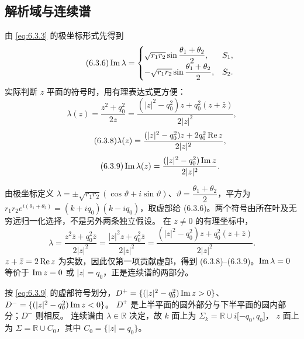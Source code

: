 \documentclass[lang=cn,scheme=chinese,mode=simple,device=normal,color=blue,
math=cm,thmcnt=section,12pt]{elegantbook}
\newcommand{\eqq}[2]{\tag{#1}\label{eq:#1}#2}
\begin{document}
\subsection{解析域与连续谱}
由 \eqref{eq:6.3.3} 的极坐标形式先得到
\begin{equation}
    \eqq{6.3.6}{\Imm\lambda=
        \begin{cases}\sqrt{r_1r_2}\sin\dfrac{\theta_1+\theta_2}{2},  & S_1, \\
             -\sqrt{r_1r_2}\sin\dfrac{\theta_1+\theta_2}{2}, & S_2.
        \end{cases}}
\end{equation}
实际判断 $z$ 平面的符号时，用有理表达式更方便：
\begin{equation}\eqq{6.3.7}{\lambda(z)=\dfrac{z^2+q_0^2}{2z}
        =\dfrac{(|z|^2-q_0^2)z+q_0^2(z+\bar z)}{2|z|^2},}\end{equation}
\begin{equation}\eqq{6.3.8}{\lambda(z)=\dfrac{(|z|^2-q_0^2)z+2q_0^2\Ree z}{2|z|^2},}\end{equation}
\begin{equation}\eqq{6.3.9}{\Imm\lambda(z)=\dfrac{(|z|^2-q_0^2)\Imm z}{2|z|^2}.}\end{equation}

\begin{callout}[计算：(6.3.3)、(6.3.6)–(6.3.9) 的分支及代数中间式]
    由极坐标定义 $\lambda=\pm\sqrt{r_1r_2}(\cos\vartheta+i\sin\vartheta)$、$\vartheta=\dfrac{\theta_1+\theta_2}{2}$，平方为 $r_1r_2e^{i(\theta_1+\theta_2)}=(k+iq_0)(k-iq_0)$，取虚部给 (6.3.6)。两个符号由所在叶及无穷远归一化选择，不是另外两条独立假设。
    在 $z\ne0$ 的有理坐标中，
    \[
        \lambda=\dfrac{z^2\bar z+q_0^2\bar z}{2|z|^2}
        =\dfrac{|z|^2z+q_0^2\bar z}{2|z|^2}
        =\dfrac{(|z|^2-q_0^2)z+q_0^2(z+\bar z)}{2|z|^2}.
    \]
    $z+\bar z=2\operatorname{Re} z$ 为实数，因此仅第一项贡献虚部，得到 (6.3.8)–(6.3.9)。$\operatorname{Im}\lambda=0$ 等价于 $\operatorname{Im} z=0$ 或 $|z|=q_0$，正是连续谱的两部分。
\end{callout}

按 \eqref{eq:6.3.9} 的虚部符号划分，$D^+=\{(|z|^2-q_0^2)\operatorname{Im} z>0\}$、$D^-=\{(|z|^2-q_0^2)\operatorname{Im} z<0\}$。
$D^+$ 是上半平面的圆外部分与下半平面的圆内部分；$D^-$ 则相反。
连续谱由 $\lambda\in\mathbb R$ 决定，故 $k$ 面上为 $\Sigma_k=\mathbb R\cup i\lbrack-q_0,q_0\rbrack$，
$z$ 面上为 $\Sigma=\mathbb R\cup C_0$，其中 $C_0=\{|z|=q_0\}$。
\end{document}
